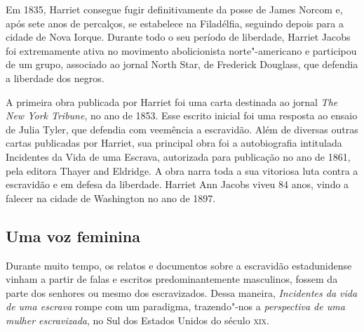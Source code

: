 \documentclass[11pt]{extarticle}
\begin{document}



Em 1835, Harriet consegue fugir definitivamente da posse de James Norcom
e, após sete anos de percalços, se estabelece na Filadélfia, seguindo
depois para a cidade de Nova Iorque. Durante todo o seu período de
liberdade, Harriet Jacobs foi extremamente ativa no movimento
abolicionista norte"-americano e participou de um grupo, associado ao
jornal North Star, de Frederick Douglass, que defendia a liberdade dos
negros.




A primeira obra publicada por Harriet foi uma carta destinada ao jornal
\emph{The New York Tribune}, no ano de 1853. Esse escrito inicial foi
uma resposta ao ensaio de Julia Tyler, que defendia com veemência a
escravidão. Além de diversas outras cartas publicadas por Harriet, sua
principal obra foi a autobiografia intitulada Incidentes da Vida de uma
Escrava, autorizada para publicação no ano de 1861, pela editora Thayer
and Eldridge. A obra narra toda a sua vitoriosa luta contra a escravidão
e em defesa da liberdade. Harriet Ann Jacobs viveu 84 anos, vindo a
falecer na cidade de Washington no ano de 1897.






\subsection{Uma voz feminina}

Durante muito tempo, os relatos e documentos sobre a escravidão
estadunidense vinham a partir de falas e escritos predominantemente
masculinos, fossem da parte dos senhores ou mesmo dos escravizados.
Dessa maneira, \emph{Incidentes da vida de uma escrava} rompe com um
paradigma, trazendo"-nos a \emph{perspectiva de uma mulher
escravizada}, no Sul dos Estados Unidos do século \textsc{xix}.
\end{document}
